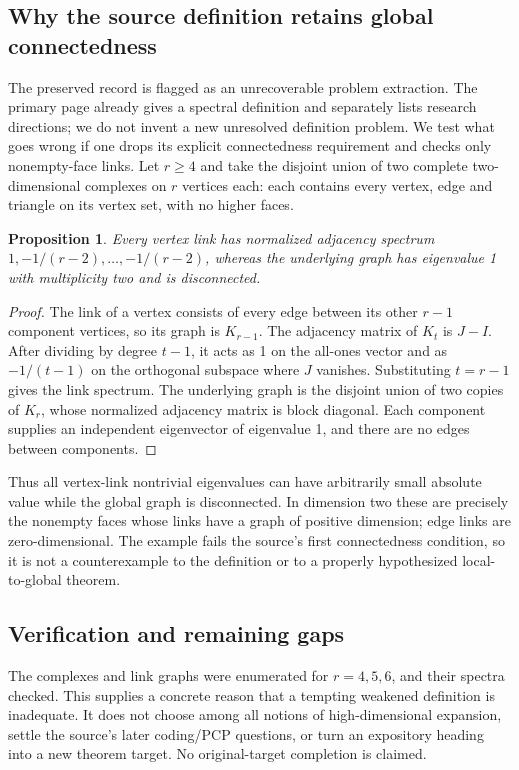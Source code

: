 \documentclass[11pt]{article}
\newtheorem{proposition}{Proposition}
\begin{document}
\subsection{Why the source definition retains global connectedness}
The preserved record is flagged as an unrecoverable problem extraction. The primary page already gives a spectral definition and separately lists research directions; we do not invent a new unresolved definition problem. We test what goes wrong if one drops its explicit connectedness requirement and checks only nonempty-face links.
Let $r\ge4$ and take the disjoint union of two complete two-dimensional complexes on $r$ vertices each: each contains every vertex, edge and triangle on its vertex set, with no higher faces.
\begin{proposition}
Every vertex link has normalized adjacency spectrum $1,-1/(r-2),\ldots,-1/(r-2)$, whereas the underlying graph has eigenvalue 1 with multiplicity two and is disconnected.
\end{proposition}
\begin{proof}
The link of a vertex consists of every edge between its other $r-1$ component vertices, so its graph is $K_{r-1}$. The adjacency matrix of $K_t$ is $J-I$. After dividing by degree $t-1$, it acts as 1 on the all-ones vector and as $-1/(t-1)$ on the orthogonal subspace where $J$ vanishes. Substituting $t=r-1$ gives the link spectrum. The underlying graph is the disjoint union of two copies of $K_r$, whose normalized adjacency matrix is block diagonal. Each component supplies an independent eigenvector of eigenvalue 1, and there are no edges between components.
\end{proof}
Thus all vertex-link nontrivial eigenvalues can have arbitrarily small absolute value while the global graph is disconnected. In dimension two these are precisely the nonempty faces whose links have a graph of positive dimension; edge links are zero-dimensional. The example fails the source's first connectedness condition, so it is not a counterexample to the definition or to a properly hypothesized local-to-global theorem.
\subsection{Verification and remaining gaps}
The complexes and link graphs were enumerated for $r=4,5,6$, and their spectra checked. This supplies a concrete reason that a tempting weakened definition is inadequate. It does not choose among all notions of high-dimensional expansion, settle the source's later coding/PCP questions, or turn an expository heading into a new theorem target. No original-target completion is claimed.
\end{document}
